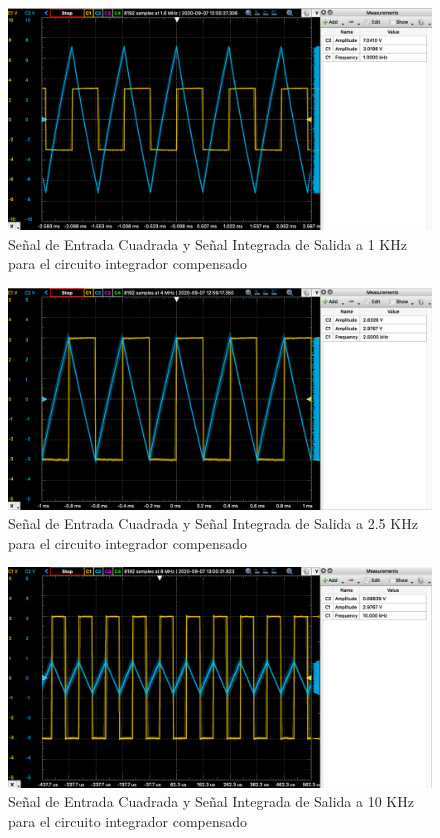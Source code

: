 \begin{figure}[H]
    \centering 
    \includegraphics [scale=0.4] {../Ejercicio3-CircuitoIntegradoresyDerivadores/Imagenes/cuadrada-compensado-1000.png} 
    \caption{Señal de Entrada Cuadrada y Señal Integrada de Salida a 1 KHz para el circuito integrador compensado }
    \label{fig:emptyPlotTool}
\end{figure}

\begin{figure}[H]
    \centering 
    \includegraphics [scale=0.4] {../Ejercicio3-CircuitoIntegradoresyDerivadores/Imagenes/cuadrada-compensado -2500.png} 
    \caption{Señal de Entrada Cuadrada y Señal Integrada de Salida a 2.5 KHz para el circuito integrador compensado }
    \label{fig:emptyPlotTool}
\end{figure}

\begin{figure}[H]
    \centering 
    \includegraphics [scale=0.4] {../Ejercicio3-CircuitoIntegradoresyDerivadores/Imagenes/cuadrada-compensado -10000.png} 
    \caption{Señal de Entrada Cuadrada y Señal Integrada de Salida a 10 KHz para el circuito integrador compensado }
    \label{fig:emptyPlotTool}
\end{figure}

